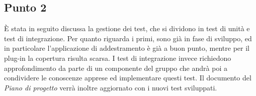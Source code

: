     \subsection{Punto 2}
        È stata in seguito discussa la gestione dei test, che si dividono in test di unità e test di integrazione. Per quanto riguarda i primi, sono già in fase di sviluppo, ed in particolare l'applicazione di addestramento è già a buon punto, mentre per il plug-in la copertura risulta scarsa. I test di integrazione invece richiedono approfondimento da parte di un componente del gruppo che andrà poi a condividere le conoscenze apprese ed implementare questi test. Il documento del \textit{Piano di progetto} verrà inoltre aggiornato con i nuovi test sviluppati.
